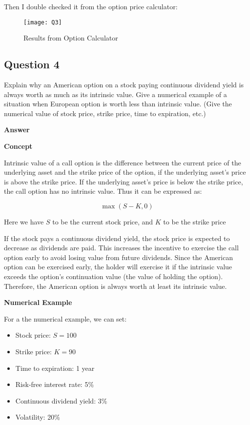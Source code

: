 \documentclass[letterpaper]{article}
\begin{document}
 Then I double checked it from the option price calculator:
 
     \begin{figure}[h]
    	\caption{Results from Option Calculator}
    	\centering
    	\texttt{[image: Q3]}
    \end{figure}
  
  
  \clearpage
	 
	 \subsection*{Question 4}
	 Explain why an American option on a stock paying continuous dividend yield is always worth as much as its intrinsic value. Give a numerical example of a situation when European option is worth less than intrinsic value. (Give the numerical value of stock price, strike price, time to expiration, etc.)
	 
	 \textbf{Answer}
	 
	 \textbf{Concept}
	 
	 Intrinsic value of a call option is the difference between the current price of the underlying asset and the strike price of the option, if the underlying asset's price is above the strike price. If the underlying asset's price is below the strike price, the call option has no intrinsic value. Thus it can be expressed as:
	 
	  \[
	 \max(S - K, 0)
	 \]
	 
	 Here we have \( S \) to be the current stock price, and \( K \) to be the strike price
	 
	If the stock pays a continuous dividend yield, the stock price is expected to decrease as dividends are paid. This increases the incentive to exercise the call option early to avoid losing value from future dividends. Since the American option can be exercised early, the holder will exercise it if the intrinsic value exceeds the option’s continuation value (the value of holding the option). Therefore, the American option is always worth at least its intrinsic value.
	 
	 \textbf{Numerical Example}
	 
	  For a the numerical example, we can set:
	 \begin{itemize}
	 	\item Stock price: \( S = 100 \)
	 	\item Strike price: \( K = 90 \)
	 	\item Time to expiration: 1 year
	 	\item Risk-free interest rate: 5\%
	 	\item Continuous dividend yield: 3\%
	 	\item Volatility: 20\%
	 \end{itemize}
	 
\end{document}
